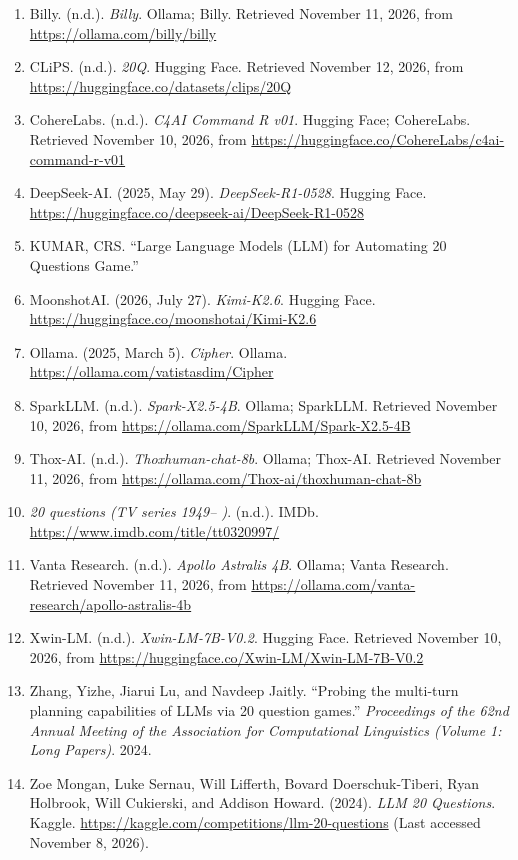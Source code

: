 \documentclass[10pt]{article}
\begin{document}
\begin{enumerate}[leftmargin=*]
    \hypertarget{ref-billy}{}\item Billy. (n.d.). \textit{Billy}. Ollama; Billy. Retrieved November 11,
    2026, from \url{https://ollama.com/billy/billy}
    \hypertarget{ref-clips}{}\item CLiPS. (n.d.). \textit{20Q}. Hugging Face. Retrieved November 12,
    2026, from \url{https://huggingface.co/datasets/clips/20Q}
    \hypertarget{ref-command-r}{}\item CohereLabs. (n.d.). \textit{C4AI Command R v01}. Hugging Face;
    CohereLabs. Retrieved November 10, 2026, from
    \url{https://huggingface.co/CohereLabs/c4ai-command-r-v01}
    \hypertarget{ref-deepseek}{}\item DeepSeek-AI. (2025, May 29). \textit{DeepSeek-R1-0528}. Hugging
    Face. \url{https://huggingface.co/deepseek-ai/DeepSeek-R1-0528}
    \item KUMAR, CRS. ``Large Language Models (LLM) for Automating 20
    Questions Game.''
    \hypertarget{ref-kimi}{}\item MoonshotAI. (2026, July 27). \textit{Kimi-K2.6}. Hugging Face.
    \url{https://huggingface.co/moonshotai/Kimi-K2.6}
    \hypertarget{ref-cipher}{}\item Ollama. (2025, March 5). \textit{Cipher}. Ollama.
    \url{https://ollama.com/vatistasdim/Cipher}
    \hypertarget{ref-spark}{}\item SparkLLM. (n.d.). \textit{Spark-X2.5-4B}. Ollama; SparkLLM.
    Retrieved November 10, 2026, from
    \url{https://ollama.com/SparkLLM/Spark-X2.5-4B}
    \hypertarget{ref-thox}{}\item Thox-AI. (n.d.). \textit{Thoxhuman-chat-8b}. Ollama; Thox-AI.
    Retrieved November 11, 2026, from
    \url{https://ollama.com/Thox-ai/thoxhuman-chat-8b}
    \hypertarget{ref-imdb}{}\item \textit{20 questions (TV series 1949-- )}. (n.d.). IMDb.
    \url{https://www.imdb.com/title/tt0320997/}
    \hypertarget{ref-apollo}{}\item Vanta Research. (n.d.). \textit{Apollo Astralis 4B}. Ollama; Vanta
    Research. Retrieved November 11, 2026, from
    \url{https://ollama.com/vanta-research/apollo-astralis-4b}
    \hypertarget{ref-xwin}{}\item Xwin-LM. (n.d.). \textit{Xwin-LM-7B-V0.2}. Hugging Face. Retrieved
    November 10, 2026, from
    \url{https://huggingface.co/Xwin-LM/Xwin-LM-7B-V0.2}
    \item Zhang, Yizhe, Jiarui Lu, and Navdeep Jaitly. ``Probing the
    multi-turn planning capabilities of LLMs via 20 question games.''
    \textit{Proceedings of the 62nd Annual Meeting of the Association for
    Computational Linguistics (Volume 1: Long Papers)}. 2024.
    \item Zoe Mongan, Luke Sernau, Will Lifferth, Bovard Doerschuk-Tiberi, Ryan
    Holbrook, Will Cukierski, and Addison Howard. (2024). \textit{LLM 20
    Questions}. Kaggle. \url{https://kaggle.com/competitions/llm-20-questions}
    (Last accessed November 8, 2026).
\end{enumerate}
\end{document}
